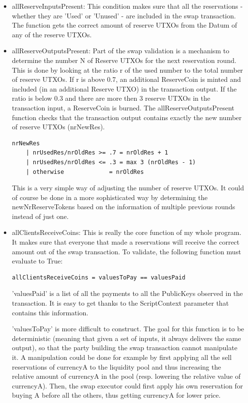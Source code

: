 \documentclass[a4paper,twoside,12pt]{report}
\begin{document}
\begin{itemize}
\item allReserveInputsPresent: This condition makes sure that all the reservations - whether they are 'Used' or 'Unused' - are included in the swap transaction. The function gets the correct amount of reserve UTXOs from the Datum of any of the reserve UTXOs.

\item allReserveOutputsPresent: Part of the swap validation is a mechanism to determine the number N of Reserve UTXOs for the next reservation round. This is done by looking at the ratio r of the used number to the total number of reserve UTXOs. If r is above 0.7, an additional ReserveCoin is minted and included (in an additional Reserve UTXO) in the transaction output. If the ratio is below 0.3 and there are more then 3 reserve UTXOs in the transaction input, a ReserveCoin is burned. The allReserveOutputsPresent function checks that the transaction output contains exactly the new number of reserve UTXOs (nrNewRes).

\begin{verbatim}
nrNewRes
    | nrUsedRes/nrOldRes >= .7 = nrOldRes + 1
    | nrUsedRes/nrOldRes <= .3 = max 3 (nrOldRes - 1)
    | otherwise             = nrOldRes 
\end{verbatim}

This is a very simple way of adjusting the number of reserve UTXOs. It could of course be done in a more sophisticated way by determining the newNrReserveTokens based on the information of multiple previous rounds instead of just one. 

\item allClientsReceiveCoins: This is really the core function of my whole program. It makes sure that everyone that made a reservations will receive the correct amount out of the swap transaction. 
To validate, the following function must evaluate to True:
\begin{verbatim}
allClientsReceiveCoins = valuesToPay == valuesPaid
\end{verbatim}

'valuesPaid' is a list of all the payments to all the PublicKeys observed in the transaction. It is easy to get thanks to the ScriptContext parameter that contains this information. 

'valuesToPay' is more difficult to construct. The goal for this function is to be deterministic (meaning that given a set of inputs, it always delivers the same output), so that the party building the swap transaction cannot manipulate it. A manipulation could be done for example by first applying all the sell reservations of currencyA to the liquidity pool and thus increasing the relative amount of currencyA in the pool (resp. lowering the relative value of currencyA). Then, the swap executor could first apply his own reservation for buying A before all the others, thus getting currencyA for lower price.


\end{itemize}
\end{document}
